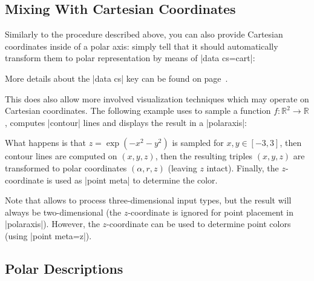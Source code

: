 {\subsection{Mixing With Cartesian Coordinates}
\label{sec:polar:cart}

Similarly to the procedure described above, you can also provide Cartesian
coordinates inside of a polar axis: simply tell \PGFPlots{} that it should
automatically transform them to polar representation by means of
|data cs=cart|:
%
\begin{codeexample}[]
\end{codeexample}
%
\noindent More details about the |data cs| key can be found on
page~\pageref{key:data:cs}.

This does also allow more involved visualization techniques which may operate
on Cartesian coordinates. The following example uses  to
sample a function $f\colon \mathbb{R}^2 \to \mathbb{R}$, computes |contour| lines and displays the result in a |polaraxis|:
%
\pgfplotsexpensiveexample
\begin{codeexample}[]
\end{codeexample}
%
\noindent What happens is that $z=\exp(-x^2-y^2)$ is sampled for $x,y \in
[-3,3]$, then contour lines are computed on $(x,y,z)$, then the resulting
triples $(x,y,z)$ are transformed to polar coordinates $(\alpha,r,z)$ (leaving
$z$ intact). Finally, the $z$-coordinate is used as |point meta| to determine
the color.

Note that  allows to process three-dimensional input
types, but the result will always be two-dimensional (the $z$-coordinate is
ignored for point placement in |polaraxis|). However, the $z$-coordinate can be
used to determine point colors (using |point meta=z|).


\subsection{Polar Descriptions}

}
